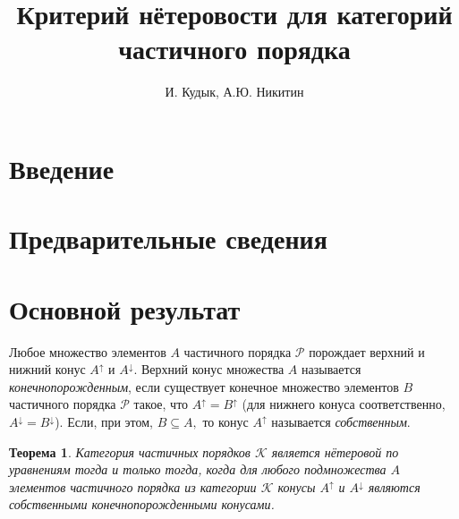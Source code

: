 \documentclass[12pt]{article}
\title{Критерий нётеровости для категорий частичного порядка}
\author{И. Кудык, А.Ю. Никитин}
\theoremstyle{break}
\newtheorem{Th}{Теорема}
\def\P{\mathcal{P}}
\begin{document}
    \maketitle %
    \thispagestyle{empty} %
    \tableofcontents %
    \newpage
    
    \section{Введение} %

	\section{Предварительные сведения}
	
	\section{Основной результат}
		Любое множество элементов $A$ частичного порядка $\P$ порождает верхний и нижний конус $A^{\uparrow}$ и $A^{\downarrow}$. Верхний конус множества $A$ называется \textit{конечнопорожденным}, если существует конечное множество элементов $B$ частичного порядка $\P$ такое, что $A^{\uparrow} = B^{\uparrow}$ (для нижнего конуса соответственно, $A^{\downarrow} = B^{\downarrow}$). Если, при этом, $B\subseteq A,$ то конус $A^{\uparrow}$ называется \textit{собственным}.

		\begin{Th}
			Категория частичных порядков $\mathcal{K}$ является нётеровой по уравнениям тогда и только тогда, когда для любого подмножества $A$ элементов частичного порядка из категории $\mathcal{K}$ конусы $A^{\uparrow}$ и $A^{\downarrow}$ являются собственными конечнопорожденными конусами.
		\end{Th}
\end{document}

